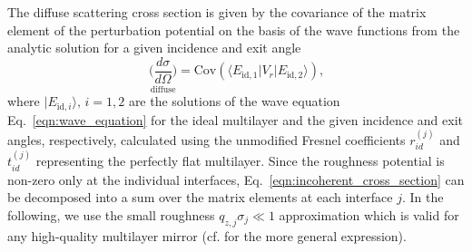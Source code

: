 The diffuse scattering cross section is given by the covariance of the matrix element of the perturbation potential on the basis of the wave functions from the analytic solution for a given incidence and exit angle \cite{PhysRevB.38.2297,PhysRevB.49.10668} 
\begin{equation}
        \underset{\text{diffuse}}{\Big(\frac{d \sigma}{d \Omega}\Big)}= \text{Cov}(\langle E_{\text{id},1}| V_r|E_{\text{id},2}\rangle)\text{,} \label{eqn:incoherent_cross_section} 
\end{equation}
where $|E_{\text{id},i}\rangle\text{, }i =1,2$ are the solutions of the wave equation Eq.~\eqref{eqn:wave_equation} for the ideal multilayer and the given incidence and exit angles, respectively, calculated using the unmodified Fresnel coefficients $r_{id}^{(j)}$ and $t_{id}^{(j)}$ representing the perfectly flat multilayer. Since the roughness potential is non-zero only at the individual interfaces, Eq.~\eqref{eqn:incoherent_cross_section} can be decomposed into a sum over the matrix elements at each interface $j$. In the following, we use the small roughness $q_{z,j} \sigma_j \ll 1$ approximation which is valid for any high-quality multilayer mirror (cf. \cite{PhysRevB.53.6048} for the more general expression).

